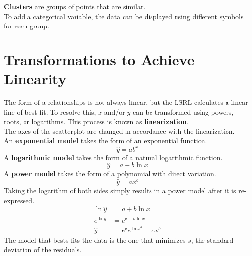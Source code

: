 \documentclass[../AP_Statistics.tex]{subfiles}
\begin{document}
			\textbf{Clusters} are groups of points that are similar. \\
			To add a categorical variable, the data can be displayed using different symbols for each group. \\
		\section{Transformations to Achieve Linearity}
			The form of a relationships is not always linear, but the LSRL calculates a linear line of best fit. To resolve this, $x$ and/or $y$ can be transformed using powers, roots, or logarithms. This process is known as \textbf{linearization}. \\
			The axes of the scatterplot are changed in accordance with the linearization. \\
			An \textbf{exponential model} takes the form of an exponential function.
			$$\hat{y} = ab^x$$
			A \textbf{logarithmic model} takes the form of a natural logarithmic function.
			$$\hat{y} = a + b\ln x$$
			A \textbf{power model} takes the form of a polynomial with direct variation.
			$$\hat{y} = ax^b$$
			Taking the logarithm of both sides simply results in a power model after it is re-expressed.
			\begin{align*}
				\ln \hat{y} &= a + b\ln x \\
				e^{\ln \hat{y}} &= e^{a + b\ln x} \\
				\hat{y} &= e^a e^{\ln x^b} = cx^b
			\end{align*}
			The model that bests fits the data is the one that minimizes $s$, the standard deviation of the residuals.
\end{document}
